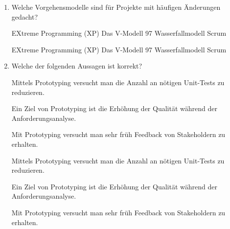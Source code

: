 \documentclass{bschlangaul-aufgabe}
\begin{document}
\begin{enumerate}

%

\item  Welche Vorgehensmodelle sind für Projekte mit häufigen Änderungen
gedacht?

\begin{itemize}
\bCheckboxLeer EXtreme Programming (XP)
\bCheckboxLeer Das V-Modell 97
\bCheckboxLeer Wasserfallmodell
\bCheckboxLeer Scrum
\end{itemize}

\begin{bAntwort}
\begin{itemize}
\bCheckboxAngekreuzt EXtreme Programming (XP)
\bCheckboxLeer Das V-Modell 97
\bCheckboxLeer Wasserfallmodell
\bCheckboxAngekreuzt Scrum
\end{itemize}
\end{bAntwort}

%

\item Welche der folgenden Aussagen ist korrekt?

\begin{itemize}
\bCheckboxLeer Mittels Prototyping versucht man die Anzahl
an nötigen Unit-Tests zu reduzieren.

\bCheckboxLeer Ein Ziel von Prototyping ist die Erhöhung der Qualität
während der Anforderungsanalyse.

\bCheckboxLeer Mit Prototyping versucht man sehr früh Feedback von
Stakeholdern zu erhalten.
\end{itemize}

\begin{bAntwort}
\begin{itemize}
\bCheckboxLeer Mittels Prototyping versucht man die
Anzahl an nötigen Unit-Tests zu reduzieren.

\bCheckboxAngekreuzt Ein Ziel von Prototyping ist die Erhöhung der
Qualität während der Anforderungsanalyse.

\bCheckboxAngekreuzt Mit Prototyping versucht man sehr früh Feedback von
Stakeholdern zu erhalten.
\end{itemize}
\end{bAntwort}


\end{enumerate}
\end{document}
